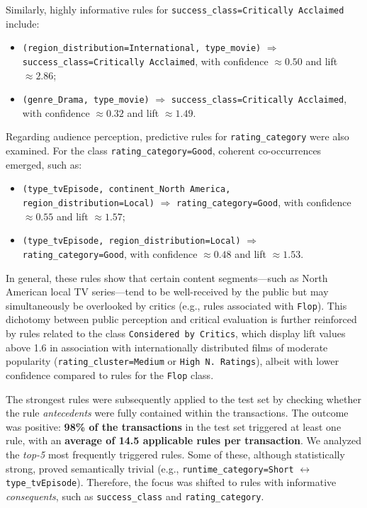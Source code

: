 \documentclass[10pt]{article}
\begin{document}
Similarly, highly informative rules for \texttt{success\_class=Critically Acclaimed} include:
\begin{itemize}
    \item \texttt{(region\_distribution=International, type\_movie)} $\Rightarrow$ \texttt{success\_class=Critically Acclaimed}, with confidence $\approx 0.50$ and lift $\approx 2.86$;
    \item \texttt{(genre\_Drama, type\_movie)} $\Rightarrow$ \texttt{success\_class=Critically Acclaimed}, with confidence $\approx 0.32$ and lift $\approx 1.49$.
\end{itemize}

Regarding audience perception, predictive rules for \texttt{rating\_category} were also examined. For the class \texttt{rating\_category=Good}, coherent co-occurrences emerged, such as:
\begin{itemize}
    \item \texttt{(type\_tvEpisode, continent\_North America, region\_distribution=Local)} $\Rightarrow$ \texttt{rating\_category=Good}, with confidence $\approx 0.55$ and lift $\approx 1.57$;
    \item \texttt{(type\_tvEpisode, region\_distribution=Local)} $\Rightarrow$ \texttt{rating\_category=Good}, with confidence $\approx 0.48$ and lift $\approx 1.53$.
\end{itemize}

In general, these rules show that certain content segments—such as North American local TV series—tend to be well-received by the public but may simultaneously be overlooked by critics (e.g., rules associated with \texttt{Flop}).
This dichotomy between public perception and critical evaluation is further reinforced by rules related to the class \texttt{Considered by Critics}, which display lift values above 1.6 in association with internationally distributed films of moderate popularity (\texttt{rating\_cluster=Medium} or \texttt{High N. Ratings}), albeit with lower confidence compared to rules for the \texttt{Flop} class.

The strongest rules were subsequently applied to the test set by checking whether the rule \textit{antecedents} were fully contained within the transactions. The outcome was positive: \textbf{98\% of the transactions} in the test set triggered at least one rule, with an \textbf{average of 14.5 applicable rules per transaction}.
We analyzed the \textit{top-5} most frequently triggered rules. Some of these, although statistically strong, proved semantically trivial (e.g., \texttt{runtime\_category=Short} $\leftrightarrow$ \texttt{type\_tvEpisode}). Therefore, the focus was shifted to rules with informative \textit{consequents}, such as \texttt{success\_class} and \texttt{rating\_category}.
\end{document}
